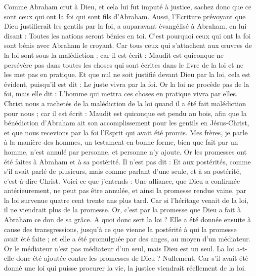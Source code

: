 \begin{multicols}{2}
Comme Abraham crut à Dieu, et cela lui fut imputé à justice,
sachez donc que ce sont ceux qui ont la foi qui sont fils d'Abraham.
Aussi, l'Ecriture prévoyant que Dieu justifierait les gentils par la foi, a auparavant évangélisé à Abraham, en lui disant : Toutes les nations seront bénies en toi.
C'est pourquoi ceux qui ont la foi sont bénis avec Abraham le croyant.
Car tous ceux qui s’attachent aux œuvres de la loi sont sous la malédiction ; car il est écrit : Maudit est quiconque ne persévère pas dans toutes les choses qui sont écrites dans le livre de la loi et ne les met pas en pratique.
Et que nul ne soit justifié devant Dieu par la loi, cela est évident, puisqu’il est dit : Le juste vivra par la foi.
Or la loi ne procède pas de la foi, mais elle dit : L'homme qui mettra ces choses en pratique vivra par elles.
Christ nous a rachetés de la malédiction de la loi quand il a été fait malédiction pour nous ; car il est écrit : Maudit est quiconque est pendu au bois,
afin que la bénédiction d'Abraham ait son accomplissement pour les gentils en Jésus-Christ, et que nous recevions par la foi l'Esprit qui avait été promis.
Mes frères, je parle à la manière des hommes, un testament en bonne forme, bien que fait par un homme, n’est annulé par personne, et personne n’y ajoute.
Or les promesses ont été faites à Abraham et à sa postérité. Il n'est pas dit : Et aux postérités, comme s'il avait parlé de plusieurs, mais comme parlant d'une seule, et à sa postérité, c’est-à-dire Christ.
Voici ce que j’entends : Une alliance, que Dieu a confirmée antérieurement, ne peut pas être annulée, et ainsi la promesse rendue vaine, par la loi survenue quatre cent trente ans plus tard.
Car si l'héritage venait de la loi, il ne viendrait plus de la promesse. Or, c’est par la promesse que Dieu a fait à Abraham ce don de sa grâce.
A quoi donc sert la loi ? Elle a été donnée ensuite à cause des transgressions, jusqu'à ce que vienne la postérité à qui la promesse avait été faite ; et elle a été promulguée par des anges, au moyen d'un médiateur.
Or le médiateur n'est pas médiateur d'un seul, mais Dieu est un seul.
La loi a-t-elle donc été ajoutée contre les promesses de Dieu ? Nullement. Car s’il avait été donné une loi qui puisse procurer la vie, la justice viendrait réellement de la loi.

\end{multicols}
